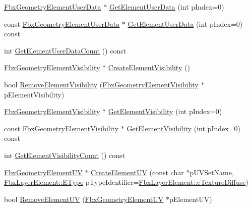 \begin{DoxyCompactItemize}
\item 
\hyperlink{fbxlayer_8h_acef498b248e323a189b5ccbf478b0b41}{Fbx\+Geometry\+Element\+User\+Data} $\ast$ \hyperlink{class_fbx_geometry_base_aaae41fe6881f55fb722cb9fae88c5bbf}{Get\+Element\+User\+Data} (int p\+Index=0)
\item 
const \hyperlink{fbxlayer_8h_acef498b248e323a189b5ccbf478b0b41}{Fbx\+Geometry\+Element\+User\+Data} $\ast$ \hyperlink{class_fbx_geometry_base_a40c905252aebb1ea71bd4d71a4c8704d}{Get\+Element\+User\+Data} (int p\+Index=0) const
\item 
int \hyperlink{class_fbx_geometry_base_a8ea1964abcfde21f82d576ca07ac7f67}{Get\+Element\+User\+Data\+Count} () const
\item 
\hyperlink{fbxlayer_8h_a98f6c16a3021e9e04b0352f652eac2a1}{Fbx\+Geometry\+Element\+Visibility} $\ast$ \hyperlink{class_fbx_geometry_base_a92af07a2d0739a8e27108838c5c7eac4}{Create\+Element\+Visibility} ()
\item 
bool \hyperlink{class_fbx_geometry_base_a5265ada1a14bc10a5be69719547827b5}{Remove\+Element\+Visibility} (\hyperlink{fbxlayer_8h_a98f6c16a3021e9e04b0352f652eac2a1}{Fbx\+Geometry\+Element\+Visibility} $\ast$p\+Element\+Visibility)
\item 
\hyperlink{fbxlayer_8h_a98f6c16a3021e9e04b0352f652eac2a1}{Fbx\+Geometry\+Element\+Visibility} $\ast$ \hyperlink{class_fbx_geometry_base_ad4efa742959f1ff9db49f67cebcc5779}{Get\+Element\+Visibility} (int p\+Index=0)
\item 
const \hyperlink{fbxlayer_8h_a98f6c16a3021e9e04b0352f652eac2a1}{Fbx\+Geometry\+Element\+Visibility} $\ast$ \hyperlink{class_fbx_geometry_base_a7354e0200f75665cbc4f3137cac53046}{Get\+Element\+Visibility} (int p\+Index=0) const
\item 
int \hyperlink{class_fbx_geometry_base_a9f41f006fb1545c11e1a06c80312cda9}{Get\+Element\+Visibility\+Count} () const
\item 
\hyperlink{fbxlayer_8h_a12413531f4bb2c482e3ddbd59e3417e5}{Fbx\+Geometry\+Element\+UV} $\ast$ \hyperlink{class_fbx_geometry_base_ac2d647f718a69776037377e79dfc8c3e}{Create\+Element\+UV} (const char $\ast$p\+U\+V\+Set\+Name, \hyperlink{class_fbx_layer_element_a8c95c5cd880b56c776acd379bd86f42c}{Fbx\+Layer\+Element\+::\+E\+Type} p\+Type\+Identifier=\hyperlink{class_fbx_layer_element_a8c95c5cd880b56c776acd379bd86f42ca09829e6ecf512e7ae04d9ad8de1342fa}{Fbx\+Layer\+Element\+::e\+Texture\+Diffuse})
\item 
bool \hyperlink{class_fbx_geometry_base_a0f571119663cc96a58d42e0e555a9be6}{Remove\+Element\+UV} (\hyperlink{fbxlayer_8h_a12413531f4bb2c482e3ddbd59e3417e5}{Fbx\+Geometry\+Element\+UV} $\ast$p\+Element\+UV)

\end{DoxyCompactItemize}
